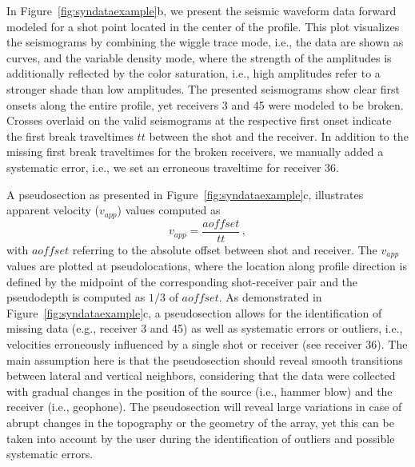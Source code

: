\documentclass[a4paper,fleqn]{cas-sc}
\begin{document}

In Figure~\ref{fig:syndataexample}b, we present the seismic waveform data forward modeled for a shot point located in the center of the profile. This plot visualizes the seismograms by combining the wiggle trace mode, i.e., the data are shown as curves, and the variable density mode, where the strength of the amplitudes is additionally reflected by the color saturation, i.e., high amplitudes refer to a stronger shade than low amplitudes. The presented seismograms show clear first onsets along the entire profile, yet receivers 3 and 45 were modeled to be broken. Crosses overlaid on the valid seismograms at the respective first onset indicate the first break traveltimes $tt$ between the shot and the receiver. In addition to the missing first break traveltimes for the broken receivers, we manually added a systematic error, i.e., we set an erroneous traveltime for receiver 36.

A pseudosection as presented in Figure~\ref{fig:syndataexample}c, illustrates apparent velocity ($v_{app}$) values computed as
\begin{equation}
	v_{app}=\frac{aoffset}{tt}\,,
	\label{eq:vapp}
\end{equation}
with $aoffset$ referring to the absolute offset between shot and receiver. The $v_{app}$ values are plotted at pseudolocations, where the location along profile direction is defined by the midpoint of the corresponding shot-receiver pair and the pseudodepth is computed as $1/3$ of $aoffset$.
As demonstrated in Figure~\ref{fig:syndataexample}c, a pseudosection allows for the identification of missing data (e.g., receiver 3 and 45) as well as systematic errors or outliers, i.e., velocities erroneously influenced by a single shot or receiver (see receiver 36). The main assumption here is that the pseudosection should reveal smooth transitions between lateral and vertical neighbors, considering that the data were collected with gradual changes in the position of the source (i.e., hammer blow) and the receiver (i.e., geophone). The pseudosection will reveal large variations in case of abrupt changes in the topography or the geometry of the array, yet this can be taken into account by the user during the identification of outliers and possible systematic errors.
\end{document}
